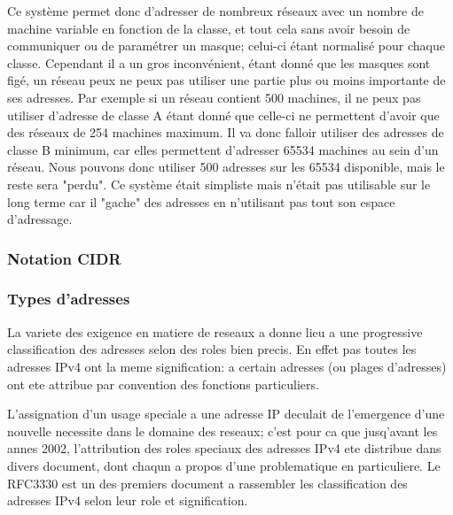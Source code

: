 Ce système permet donc d'adresser de nombreux réseaux avec un nombre de machine
variable en fonction de la classe, et tout cela sans avoir besoin de
communiquer ou de paramétrer un masque; celui-ci étant normalisé pour chaque
classe.  Cependant il a un gros inconvénient, étant donné que les masques sont
figé, un réseau peux ne peux pas utiliser une partie plus ou moins importante
de ses adresses. Par exemple si un réseau contient 500 machines, il ne peux pas
utiliser d'adresse de classe A étant donné que celle-ci ne permettent d'avoir
que des réseaux de 254 machines maximum. Il va donc falloir utiliser des
adresses de classe B minimum, car elles permettent d'adresser 65534 machines au
sein d'un réseau. Nous pouvons donc utiliser 500 adresses sur les 65534
disponible, mais le reste sera "perdu".  Ce système était simpliste mais
n'était pas utilisable sur le long terme car il "gache" des adresses en
n'utilisant pas tout son espace d'adressage.


\subsubsection{Notation CIDR}










\subsubsection{Types d'adresses}
La variete des exigence en matiere de reseaux a donne lieu a une progressive
classification des adresses selon des roles bien precis.  En effet pas toutes
les adresses IPv4 ont la meme signification: a certain adresses (ou plages
d'adresses) ont ete attribue par convention des fonctions particuliers.

L'assignation d'un usage speciale a une adresse IP deculait de l'emergence
d'une nouvelle necessite dans le domaine des reseaux; c'est pour
ca que jusq'avant les annes 2002, l'attribution des roles speciaux des adresses
IPv4 ete distribue dans divers document, dont chaqun a propos d'une
problematique en particuliere. Le RFC3330 est un des premiers document a
rassembler les classification des adresses IPv4 selon leur role et signification.


